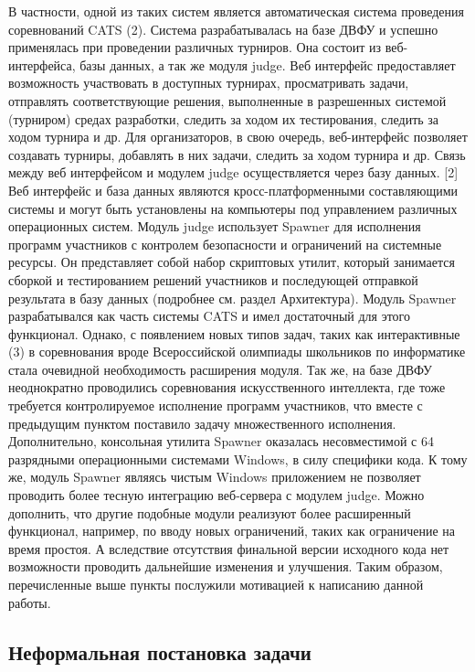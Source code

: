 \documentclass{imcs}
\begin{document}
В частности, одной из таких систем является автоматическая система проведения соревнований CATS (2). Система разрабатывалась на базе ДВФУ и успешно применялась при проведении различных турниров. Она состоит из веб-интерфейса, базы данных, а так же модуля judge.
Веб интерфейс предоставляет возможность участвовать в доступных турнирах, просматривать задачи, отправлять соответствующие решения, выполненные в разрешенных системой (турниром) средах разработки, следить за ходом их тестирования, следить за ходом турнира и др. Для организаторов, в свою очередь, веб-интерфейс позволяет создавать турниры, добавлять в них задачи, следить за ходом турнира и др.
Связь между веб интерфейсом и модулем judge осуществляется через базу данных. [2] Веб интерфейс и база данных являются кросс-платформенными составляющими системы и могут быть установлены на компьютеры под управлением различных операционных систем.
Модуль judge использует Spawner для исполнения программ участников с контролем безопасности и ограничений на системные ресурсы. Он представляет собой набор скриптовых утилит, который занимается сборкой и тестированием решений участников и последующей отправкой результата в базу данных (подробнее см. раздел Архитектура).
Модуль Spawner разрабатывался как часть системы CATS и имел достаточный для этого функционал. Однако, с появлением новых типов задач, таких как интерактивные (3) в соревнования вроде Всероссийской олимпиады школьников по информатике стала очевидной необходимость расширения модуля. Так же, на базе ДВФУ неоднократно проводились соревнования искусственного интеллекта, где тоже требуется контролируемое исполнение программ участников, что вместе с предыдущим пунктом поставило задачу множественного исполнения. Дополнительно, консольная утилита Spawner оказалась несовместимой с 64 разрядными операционными системами Windows, в силу специфики кода. К тому же, модуль Spawner являясь чистым Windows приложением не позволяет проводить более тесную интеграцию веб-сервера с модулем judge. Можно дополнить, что другие подобные модули реализуют более расширенный функционал, например, по вводу новых ограничений, таких как ограничение на время простоя. А вследствие отсутствия финальной версии исходного кода нет возможности проводить дальнейшие изменения и улучшения.
Таким образом, перечисленные выше пункты послужили мотивацией к написанию данной работы.

\subsection{Неформальная постановка задачи}
\end{document}
